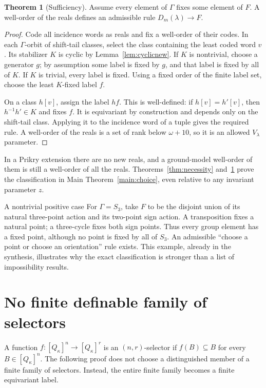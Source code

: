 \documentclass[11pt,letterpaper]{article}
\theoremstyle{definition}
\newtheorem{theorem}[definition]{Theorem}
\numberwithin{equation}{section}
\begin{document}
\begin{theorem}[Sufficiency]\label{thm:sufficiency}
Assume every element of $\Gamma$ fixes some element of $F$. A well-order of the reals defines an admissible rule $D_m(\lambda)\to F$.
\end{theorem}
\begin{proof}
Code all incidence words as reals and fix a well-order of their codes. In each $\Gamma$-orbit of shift-tail classes, select the class containing the least coded word $v$. Its stabilizer $K$ is cyclic by Lemma~\ref{lem:cyclicnew}. If $K$ is nontrivial, choose a generator $g$; by assumption some label is fixed by $g$, and that label is fixed by all of $K$. If $K$ is trivial, every label is fixed. Using a fixed order of the finite label set, choose the least $K$-fixed label $f$.

On a class $h[v]$, assign the label $h f$. This is well-defined: if $h[v]=h'[v]$, then $h^{-1}h'\in K$ and fixes $f$. It is equivariant by construction and depends only on the shift-tail class. Applying it to the incidence word of a tuple gives the required rule. A well-order of the reals is a set of rank below $\omega+10$, so it is an allowed $V_\lambda$ parameter.
\end{proof}

In a Prikry extension there are no new reals, and a ground-model well-order of them is still a well-order of all the reals. Theorems~\ref{thm:necessity} and~\ref{thm:sufficiency} prove the classification in Main Theorem~\ref{main:choice}, even relative to any invariant parameter $z$.

\begin{assessment}{A nontrivial positive case}
For $\Gamma=S_3$, take $F$ to be the disjoint union of its natural three-point action and its two-point sign action. A transposition fixes a natural point; a three-cycle fixes both sign points. Thus every group element has a fixed point, although no point is fixed by all of $S_3$. An admissible ``choose a point or choose an orientation'' rule exists. This example, already in the synthesis, illustrates why the exact classification is stronger than a list of impossibility results.
\end{assessment}

\section{No finite definable family of selectors}\label{sec:selectors}

A function $f:[Q_\kappa]^n\to[Q_\kappa]^r$ is an $(n,r)$-selector if $f(B)\subseteq B$ for every $B\in[Q_\kappa]^n$. The following proof does not choose a distinguished member of a finite family of selectors. Instead, the entire finite family becomes a finite equivariant label.
\end{document}
